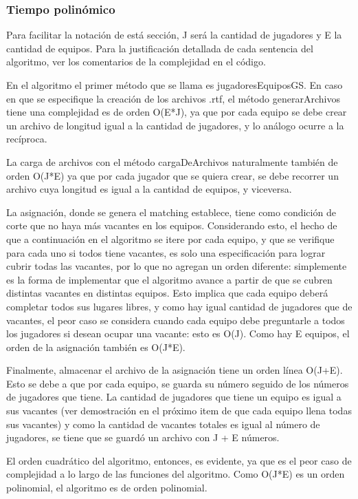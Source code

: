 \documentclass[article,a4paper]{article}
\begin{document}
\subsubsection{Tiempo polinómico}

Para facilitar la notación de está sección, J será la cantidad de jugadores y E la cantidad de equipos. Para la justificación detallada de cada sentencia del algoritmo, ver los comentarios de la complejidad en el código.

En el algoritmo el primer método que se llama es jugadoresEquiposGS. En caso en que se especifique la creación de los archivos .rtf, el método generarArchivos tiene una complejidad es de orden O(E*J), ya que por cada equipo se debe crear un archivo de longitud igual a la cantidad de jugadores, y lo análogo ocurre a la recíproca.

La carga de archivos con el método cargaDeArchivos naturalmente también de orden O(J*E) ya que por cada jugador que se quiera crear, se debe recorrer un archivo cuya longitud es igual a la cantidad de equipos, y viceversa.

La asignación, donde se genera el matching establece, tiene como condición de corte que no haya más vacantes en los equipos. Considerando esto, el hecho de que a continuación en el algoritmo se itere por cada equipo, y que se verifique para cada uno si todos tiene vacantes, es solo una especificación para lograr cubrir todas las vacantes, por lo que no agregan un orden diferente: simplemente es la forma de implementar que el algoritmo avance a partir de que se cubren distintas vacantes en distintas equipos. Esto implica que cada equipo deberá completar todos sus lugares libres, y como hay igual cantidad de jugadores que de vacantes, el peor caso se considera cuando cada equipo debe preguntarle a todos los jugadores si desean ocupar una vacante: esto es O(J). Como hay E equipos, el orden de la asignación también es O(J*E).

Finalmente, almacenar el archivo de la asignación tiene un orden línea O(J+E). Esto se debe a que por cada equipo, se guarda su número seguido de los números de jugadores que tiene. La cantidad de jugadores que tiene un equipo es igual a sus vacantes (ver demostración en el próximo item de que cada equipo llena todas sus vacantes) y como la cantidad de vacantes totales es igual al número de jugadores, se tiene que se guardó un archivo con J + E números.

El orden cuadrático del algoritmo, entonces, es evidente, ya que es el peor caso de complejidad a lo largo de las funciones del algoritmo. Como O(J*E) es un orden polinomial, el algoritmo es de orden polinomial.
\end{document}
